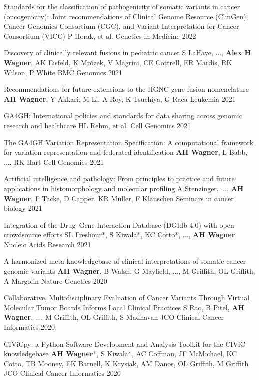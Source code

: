 \pub
{Standards for the classification of pathogenicity of somatic variants in cancer (oncogenicity): Joint recommendations of Clinical Genome Resource (ClinGen), Cancer Genomics Consortium (CGC), and Variant Interpretation for Cancer Consortium (VICC)}
{P Horak, et al.}
{Genetics in Medicine}
{2022}

\pub
{Discovery of clinically relevant fusions in pediatric cancer}
{S LaHaye, ..., {\bf Alex H Wagner}, AK Eisfeld, K Mrózek, V Magrini, CE Cottrell, ER Mardis, RK Wilson, P White}
{BMC Genomics}
{2021}

\pub
{Recommendations for future extensions to the HGNC gene fusion nomenclature}
{{\bf AH Wagner}, Y Akkari, M Li, A Roy, K Tsuchiya, G Raca}
{Leukemia}
{2021}

\pub
{GA4GH: International policies and standards for data sharing across genomic research and healthcare}
{HL Rehm, et al.}
{Cell Genomics}
{2021}

\pub
{The GA4GH Variation Representation Specification: A computational framework for variation representation and federated identification}
{{\bf AH Wagner}, L Babb, ..., RK Hart}
{Cell Genomics}
{2021}

\pub
{Artificial intelligence and pathology: From principles to practice and future applications in histomorphology and molecular profiling}
{A Stenzinger, ..., {\bf AH Wagner}, F Tacke, D Capper, KR Müller, F Klauschen}
{Seminars in cancer biology}
{2021}

\pub
{Integration of the Drug–Gene Interaction Database (DGIdb 4.0) with open crowdsource efforts}
{SL Freshour*, S Kiwala*, KC Cotto*, ..., {\bf AH Wagner}}
{Nucleic Acids Research}
{2021}

\pub
{A harmonized meta-knowledgebase of clinical interpretations of somatic cancer genomic variants}
{{\bf AH Wagner}, B Walsh, G Mayfield, ..., M Griffith, OL Griffith, A Margolin}
{Nature Genetics}
{2020}

\pub
{Collaborative, Multidisciplinary Evaluation of Cancer Variants Through Virtual Molecular Tumor Boards Informs Local Clinical Practices}
{S Rao, B Pitel, {\bf AH Wagner}, ..., M Griffith, OL Griffith, S Madhavan}
{JCO Clinical Cancer Informatics}
{2020}

\pub
{CIViCpy: a Python Software Development and Analysis Toolkit for the CIViC knowledgebase}
{{\bf AH Wagner}*, S Kiwala*, AC Coffman, JF McMichael, KC Cotto, TB Mooney, EK Barnell, K Krysiak, AM Danos, OL Griffith, M Griffith}
{JCO Clinical Cancer Informatics}
{2020}

